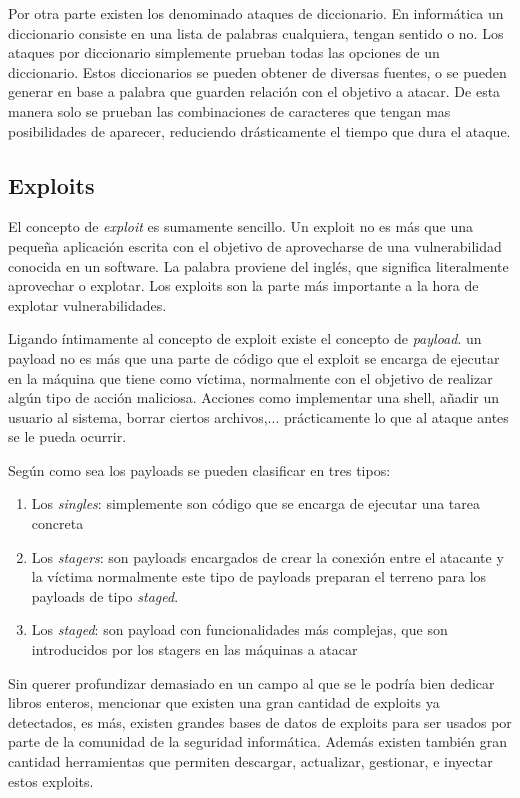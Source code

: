 Por otra parte existen los denominado ataques de diccionario. En informática un diccionario consiste en una lista de palabras cualquiera, tengan sentido o no. Los ataques por diccionario simplemente prueban todas las opciones de un diccionario. Estos diccionarios se pueden obtener de diversas fuentes, o se pueden generar en base a palabra que guarden relación con el objetivo a atacar. De esta manera solo se prueban las combinaciones de caracteres que tengan mas posibilidades de aparecer, reduciendo drásticamente el tiempo que dura el ataque.

\subsection{Exploits}

El concepto de \emph{exploit} es sumamente sencillo. Un exploit no es más que una pequeña aplicación escrita con el objetivo de aprovecharse de una vulnerabilidad conocida en un software. La palabra proviene del inglés, que significa literalmente aprovechar o explotar. Los exploits son la parte más importante a la hora de explotar vulnerabilidades.

Ligando íntimamente al concepto de exploit existe el concepto de \emph{payload}. un payload no es más que una parte de código que el exploit se encarga de ejecutar en la máquina que tiene como víctima, normalmente con el objetivo de realizar algún tipo de acción maliciosa. Acciones como implementar una shell, añadir un usuario al sistema, borrar ciertos archivos,... prácticamente lo que al ataque antes se le pueda ocurrir.

Según como sea los payloads se pueden clasificar en tres tipos:
\begin{enumerate}
	\item Los \emph{singles}: simplemente son código que se encarga de ejecutar una tarea concreta
	\item Los \emph{stagers}: son payloads encargados de crear la conexión entre el atacante y la víctima normalmente este tipo de payloads preparan el terreno para los payloads de tipo \textit{staged}.
	\item Los \emph{staged}: son payload con funcionalidades más complejas, que son introducidos por los stagers en las máquinas a atacar
\end{enumerate}

Sin querer profundizar demasiado en un campo al que se le podría bien dedicar libros enteros, mencionar que existen una gran cantidad de exploits ya detectados, es más, existen grandes bases de datos de exploits para ser usados por parte de la comunidad de la seguridad informática. Además existen también gran cantidad herramientas que permiten descargar, actualizar, gestionar, e inyectar estos exploits.

